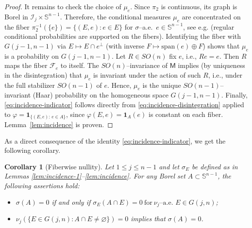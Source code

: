 \documentclass[11pt]{article}
\newtheorem{corollary}[theorem]{Corollary}
\theoremstyle{definition}
\numberwithin{equation}{section}
\newcommand{\Sph}{\mathbb{S}}        %
\newcommand{\Gr}[2]{G(#1,#2)}        %
\begin{document}
\begin{proof}
\medskip

It remains to check the choice of $\mu_e$.
Since $\pi_2$ is continuous, its graph is Borel in $\mathcal I_j\times \Sph^{n-1}$.
Therefore, the conditional measures $\mu_e$ are concentrated on the fiber $\pi_2^{-1}(\{e\})=\{(E,e):e\in E\}$ for $\sigma$–a.e.\ $e \in \mathbb S^{n - 1}$, see e.g. \cite[Corollary 10.5.7]{Bogachev_2007} (regular conditional probabilities are supported on the fibers). 
Identifying the fiber with $G(j-1,n-1)$ via $E\mapsto E\cap e^\perp$ (with inverse $F \mapsto \mathrm{span}(e) \oplus F$) shows that $\mu_e$ is a probability on $G(j-1,n-1)$. 
Let $R\in SO(n)$ fix $e$, i.e., $Re=e$. Then $R$ maps the fiber $\mathcal F_e$ to itself. The $SO(n)$–invariance of $\mathsf M$ implies (by uniqueness in the disintegration) that $\mu_e$ is invariant under the action of such $R$, i.e., under the full stabilizer $SO(n-1)$ of $e$. 
Hence, $\mu_e$ is the unique $SO(n-1)$–invariant (Haar) probability on the homogeneous space $G(j-1,n-1)$. 
Finally, \eqref{eq:incidence-indicator} follows directly from \eqref{eq:incidence-disintegration} applied to 
\(\varphi = \mathbf{1}_{\{(E,e):\, e \in A\}}\), 
since \(\varphi(E,e) = \mathbf{1}_A(e)\) is constant on each fiber.
Lemma~\ref{lem:incidence} is proven.
\end{proof}

As a direct consequence of the identity \eqref{eq:incidence-indicator}, we get the following corollary.


\begin{corollary}[Fiberwise nullity]\label{cor:incidence-positivity}
Let $1 \leq j \leq n - 1$ and let $\sigma_E$ be defined as in Lemmas \ref{lem:incidence-1}--\ref{lem:incidence}.
For any Borel set $A \subset \Sph^{n-1}$, the following assertions hold:
\begin{itemize}
    \item[(i)] $\sigma(A) = 0$ if and only if 
    $\sigma_E(A \cap E) = 0 \ \text{for}\ \nu_j\text{--a.e. } E \in G(j,n)$;
    
    \item[(ii)] $\nu_j(\{E \in \Gr{j}{n} : A \cap E \neq \varnothing\}) = 0$ implies that $\sigma(A)=0$.
\end{itemize}
\end{corollary}
\end{document}

